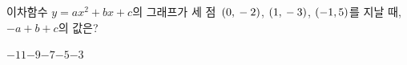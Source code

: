 이차함수 $y=ax^2+bx+c$의 그래프가 세 점~$(0{,}\mkern3mu -2)$, $(1{,}\mkern3mu -3)$, $(-1{,}\mkern3mu 5)$를 지날 때, $-a+b+c$의 값은? 
\begin{choices32}{$-11$}{$-9$}{$-7$}{$-5$}{$-3$}\end{choices32}
